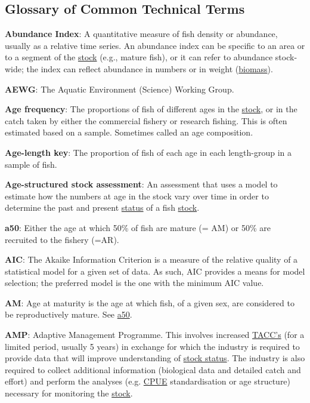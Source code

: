 \documentclass{mpi-plenary}
\theoremstyle{definition}
\theoremstyle{definition}
\theoremstyle{definition}
\theoremstyle{remark}
\begin{document}
\subsection{Glossary of Common Technical
Terms}\label{glossary-of-common-technical-terms}

\protect\hypertarget{def-abundance-index}{}{} \textbf{Abundance Index}:
A quantitative measure of fish density or abundance, usually as a
relative time series. An abundance index can be specific to an area or
to a segment of the \protect\hyperlink{def-stock}{stock} (e.g., mature
fish), or it can refer to abundance stock-wide; the index can reflect
abundance in numbers or in weight
(\protect\hyperlink{def-biomass}{biomass}).

\protect\hypertarget{def-aewg}{}{} \textbf{AEWG}: The Aquatic
Environment (Science) Working Group.

\protect\hypertarget{def-age-frequency}{}{} \textbf{Age frequency}: The
proportions of fish of different ages in the
\protect\hyperlink{def-stock}{stock}, or in the catch taken by either
the commercial fishery or research fishing. This is often estimated
based on a sample. Sometimes called an age composition.

\protect\hypertarget{def-age-length-key}{}{} \textbf{Age-length key}:
The proportion of fish of each age in each length-group in a sample of
fish.

\protect\hypertarget{def-age-structured-stock-assessment}{}{}
\textbf{Age-structured stock assessment}: An assessment that uses a
model to estimate how the numbers at age in the stock vary over time in
order to determine the past and present
\protect\hyperlink{def-stock-status}{status} of a fish
\protect\hyperlink{def-stock}{stock}.

\protect\hypertarget{def-a50}{}{} \textbf{a50}: Either the age at which
50\% of fish are mature (= AM) or 50\% are recruited to the fishery
(=AR).

\protect\hypertarget{def-aic}{}{} \textbf{AIC}: The Akaike Information
Criterion is a measure of the relative quality of a statistical model
for a given set of data. As such, AIC provides a means for model
selection; the preferred model is the one with the minimum AIC value.

\protect\hypertarget{def-am}{}{} \textbf{AM}: Age at maturity is the age
at which fish, of a given sex, are considered to be reproductively
mature. See \protect\hyperlink{def-a50}{a50}.

\protect\hypertarget{def-amp}{}{} \textbf{AMP}: Adaptive Management
Programme. This involves increased \protect\hyperlink{def-tacc}{TACC's}
(for a limited period, usually 5 years) in exchange for which the
industry is required to provide data that will improve understanding of
\protect\hyperlink{def-stock-status}{stock status}. The industry is also
required to collect additional information (biological data and detailed
catch and effort) and perform the analyses (e.g.
\protect\hyperlink{def-cpue}{CPUE} standardisation or age structure)
necessary for monitoring the \protect\hyperlink{def-stock}{stock}.
\end{document}
